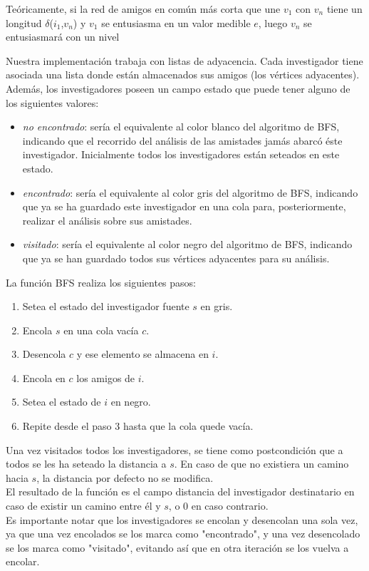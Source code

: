 \indent Teóricamente, si la red de amigos en común más corta que
une $v_1$ con $v_n$ tiene un longitud $\delta$($i_1$,$v_n$) y $v_1$ se
entusiasma en un valor medible $e$,
luego $v_n$ se
entusiasmará con un nivel

\indent Nuestra implementación trabaja con listas de adyacencia. Cada
investigador tiene asociada una lista donde están almacenados sus amigos (los
vértices adyacentes). Además, los investigadores poseen un campo estado que
puede tener alguno de los siguientes valores:

\begin{itemize}
\item \textit{no encontrado}: sería el equivalente al color blanco del algoritmo
de BFS, indicando que el recorrido del análisis de las amistades jamás abarcó
éste investigador. Inicialmente todos los investigadores están seteados
en este estado.
\item \textit{encontrado}: sería el equivalente al color gris del algoritmo de
BFS, indicando que ya se ha guardado este investigador en una cola para,
posteriormente, realizar el análisis sobre sus amistades.
\item \textit{visitado}: sería el equivalente al color negro del algoritmo de
BFS, indicando que ya se han guardado todos sus vértices adyacentes para su
análisis.
\end{itemize}

\hspace{-0.5cm}La función BFS realiza los siguientes pasos:
\begin{enumerate}
 \item Setea el estado del investigador fuente $s$ en gris.
 \item Encola $s$ en una cola vacía $c$.
 \item Desencola $c$ y ese elemento se almacena en $i$.
 \item Encola en $c$ los amigos de $i$.
 \item Setea el estado de $i$ en negro.
 \item Repite desde el paso 3 hasta que la cola quede vacía.
\end{enumerate}

\indent Una vez visitados todos los investigadores, se tiene como
postcondición que a todos se les ha seteado la distancia a $s$. En caso de que
no existiera un camino hacia $s$, la distancia por defecto no se modifica.\\ 
\indent El resultado de la función es el campo distancia del investigador
destinatario en caso de existir un camino entre él y $s$, o 0 en caso
contrario.\\
\indent Es importante notar que los investigadores se encolan y desencolan una
sola vez, ya que una vez encolados se los marca como "encontrado", y una vez
desencolado se los marca como "visitado", evitando así que en otra iteración se
los vuelva a encolar.

